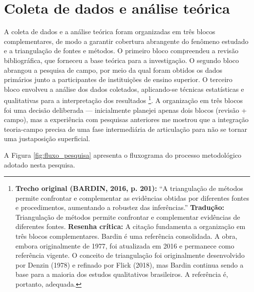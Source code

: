 \section{Coleta de dados e análise teórica}
\label{sec:coleta_analise}

A coleta de dados e a análise teórica foram organizadas em três blocos complementares, de modo a garantir cobertura abrangente do fenômeno estudado e a triangulação de fontes e métodos. O primeiro bloco compreendeu a revisão bibliográfica, que forneceu a base teórica para a investigação. O segundo bloco abrangou a pesquisa de campo, por meio da qual foram obtidos os dados primários junto a participantes de instituições de ensino superior. O terceiro bloco envolveu a análise dos dados coletados, aplicando-se técnicas estatísticas e qualitativas para a interpretação dos resultados \cite{BARDIN2016}\footnote{\textbf{Trecho original (BARDIN, 2016, p. 201):} ``A triangulação de métodos permite confrontar e complementar as evidências obtidas por diferentes fontes e procedimentos, aumentando a robustez das inferências.'' \textbf{Tradução:} Triangulação de métodos permite confrontar e complementar evidências de diferentes fontes. \textbf{Resenha crítica:} A citação fundamenta a organização em três blocos complementares. Bardin é uma referência consolidada. A obra, embora originalmente de 1977, foi atualizada em 2016 e permanece como referência vigente. O conceito de triangulação foi originalmente desenvolvido por Denzin (1978) e refinado por Flick (2018), mas Bardin continua sendo a base para a maioria dos estudos qualitativos brasileiros. A referência é, portanto, adequada.}. A organização em três blocos foi uma decisão deliberada — inicialmente planejei apenas dois blocos (revisão + campo), mas a experiência com pesquisas anteriores me mostrou que a integração teoria-campo precisa de uma fase intermediária de articulação para não se tornar uma justaposição superficial.

A Figura \ref{fig:fluxo_pesquisa} apresenta o fluxograma do processo metodológico adotado nesta pesquisa.

